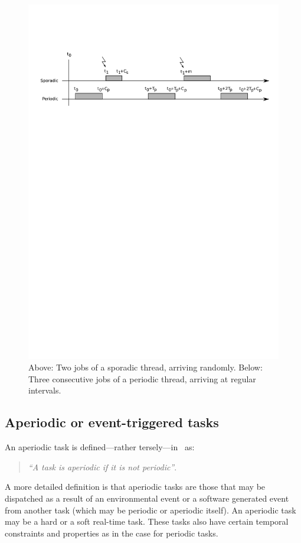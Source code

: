 \begin{figure}
\centering
\includegraphics[scale=0.6]{figs/thread_timeline}
\caption{Above: Two jobs of a sporadic thread, arriving
  randomly. Below: Three consecutive jobs of a periodic thread,
  arriving at regular intervals.}
\label{fig:thread_timeline}
\end{figure}

\subsection{Aperiodic or event-triggered tasks}
An aperiodic task is defined---rather tersely---in~\cite{sha@rts04}
as:

\begin{quote}
\emph{``A task is aperiodic if it is not periodic''}. 
\end{quote}

A more detailed definition is that aperiodic tasks are those that
may be dispatched as a result of an environmental event or a software
generated event from another task (which may be periodic or
aperiodic itself). An aperiodic task may be a hard or a soft
real-time task. These tasks also have certain temporal constraints
and properties as in the case for periodic tasks.

